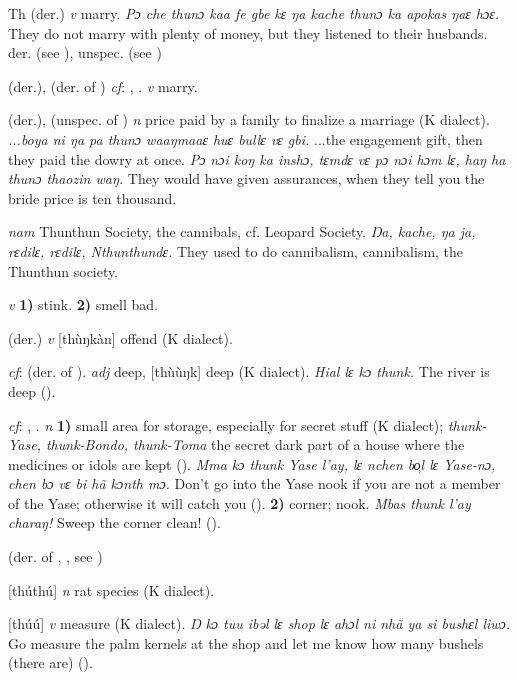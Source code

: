 \begin{letter}{Th}
 (der.) \textit{v} marry. \textit{Pɔ che thunɔ kaa fe gbe kɛ ŋa kache thunɔ ka apokas ŋaɛ hɔɛ.} They do not marry with plenty of money, but they listened to their husbands. der.  (see ), unspec.  (see )

 (der.), (der. of ) \textit{cf}: , . \textit{v} marry.

 (der.), (unspec. of ) \textit{n} price paid by a family to finalize a marriage (K dialect). \textit{...boya ni ŋa pa thunɔ waaŋmaaɛ huɛ bullɛ vɛ gbi.} ...the engagement gift, then they paid the dowry at once. \textit{Pɔ nɔi koŋ ka inshɔ, tɛmdɛ vɛ pɔ nɔi hɔm lɛ, haŋ ha thunɔ thaozin waŋ.} They would have given assurances, when they tell you the bride price is ten thousand.

 \textit{nam} Thunthun Society, the cannibals, cf. Leopard Society. \textit{Ŋa, kache, ŋa ja, rɛdilɛ, rɛdilɛ, Nthunthundɛ.} They used to do cannibalism, cannibalism, the Thunthun society.

 \textit{v} \textbf{1)} stink. \textbf{2)} smell bad.

 (der.) \textit{v} [thùŋkàn] offend (K dialect).

 \textit{cf}:  (der. of ). \textit{adj} deep, [thùùŋk] deep (K dialect). \textit{Hial lɛ kɔ thunk.} The river is deep (\citealt{Pichl1967}).

 \textit{cf}: , . \textit{n} \textbf{1)} small area for storage, especially for secret stuff (K dialect); \textit{thunk-Yase, thunk-Bondo, thunk-Toma} the secret dark part of a house where the medicines or idols are kept (\citealt{Pichl1967}). \textit{Mma kɔ thunk Yase l'ay, lɛ nchen bo̹l lɛ Yase-nɔ, chen bɔ vɛ bi hã kɔnth mɔ.} Don't go into the Yase nook if you are not a member of the Yase; otherwise it will catch you (\citealt{Pichl1967}). \textbf{2)} corner; nook. \textit{Mbas thunk l'ay charaŋ!} Sweep the corner clean! (\citealt{Pichl1967}). 

(der. of , , see ) 

 [thúthú] \textit{n} rat species (K dialect). 

 [thúú] \textit{v} measure (K dialect). \textit{Ŋ kɔ tuu ibəl lɛ shop lɛ ahɔl ni nhã ya si bushɛl liwɔ.} Go measure the palm kernels at the shop and let me know how many bushels (there are) (\citealt{Pichl1967}). 

\end{letter}

